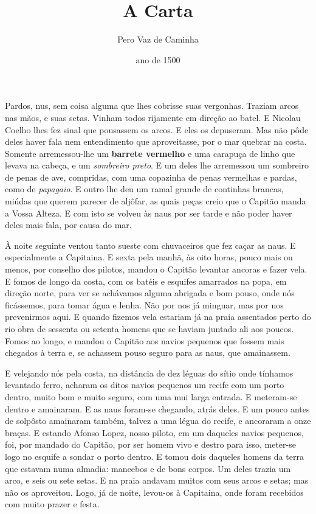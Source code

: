 \documentclass[12pt,a4paper]{article}
\author{Pero Vaz de Caminha}
\date{ ano de 1500}
\title{A Carta}
\begin{document}
\maketitle %

Pardos, nus, sem coisa alguma que lhes cobrisse suas vergonhas. Traziam
arcos nas mãos, e suas setas. Vinham todos rijamente em direção ao batel. E
{\Huge Nicolau Coelho} lhes fez sinal que pousassem os arcos. E eles os depuseram. Mas
não pôde deles haver fala nem entendimento que aproveitasse, por o mar quebrar
na costa. Somente arremessou-lhe um {\bf barrete vermelho} e uma carapuça de linho
que levava na cabeça, e um \textit{sombreiro preto}. E um deles lhe arremessou um
sombreiro de penas de ave, compridas, com uma copazinha de penas vermelhas e
pardas, como de {\it papagaio}. E outro lhe deu um ramal grande de continhas brancas,
miúdas que querem parecer de aljôfar, as quais peças creio que o Capitão manda a
Vossa Alteza. E com isto se volveu às naus por ser tarde e não poder haver deles
mais fala, por causa do mar.

À noite seguinte ventou tanto sueste com chuvaceiros que fez caçar as naus.
E especialmente a Capitaina. E sexta pela manhã, às oito horas, pouco mais ou
menos, por conselho dos pilotos, mandou o Capitão levantar ancoras e fazer vela. E
fomos de longo da costa, com os batéis e esquifes amarrados na popa, em direção
norte, para ver se achávamos alguma abrigada e bom pouso, onde nós ficássemos,
para tomar água e lenha. Não por nos já minguar, mas por nos prevenirmos aqui. E
quando fizemos vela estariam já na praia assentados perto do rio obra de sessenta
ou setenta homens que se haviam juntado ali aos poucos. Fomos ao longo, e
mandou o Capitão aos navios pequenos que fossem mais chegados à terra e, se
achassem pouso seguro para as naus, que amainassem.

E velejando nós pela costa, na distância de dez léguas do sítio onde tínhamos
levantado ferro, acharam os ditos navios pequenos um recife com um porto dentro,
muito bom e muito seguro, com uma mui larga entrada. E meteram-se dentro e
amainaram. E as naus foram-se chegando, atrás deles. E um pouco antes de solpôsto amainaram também, talvez a uma légua do recife, e ancoraram a onze braças.
E estando Afonso Lopez, nosso piloto, em um daqueles navios pequenos, foi,
por mandado do Capitão, por ser homem vivo e destro para isso, meter-se logo no
esquife a sondar o porto dentro. E tomou dois daqueles homens da terra que
estavam numa almadia: mancebos e de bons corpos. Um deles trazia um arco, e
seis ou sete setas. E na praia andavam muitos com seus arcos e setas; mas não os
aproveitou. Logo, já de noite, levou-os à Capitaina, onde foram recebidos com muito
prazer e festa.
\end{document}

